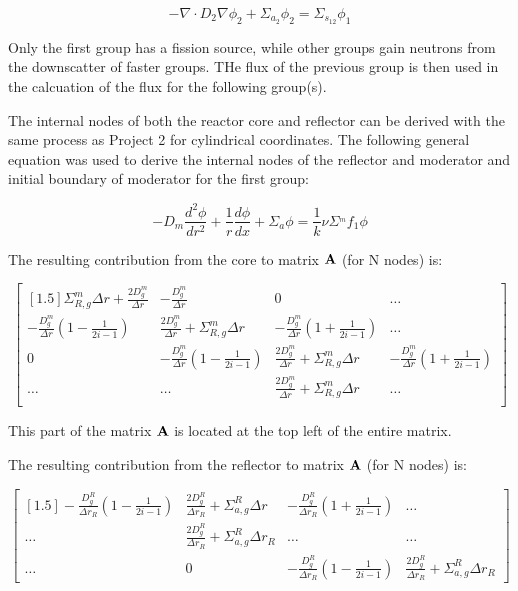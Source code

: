 \documentclass[../main.tex]{subfiles}
\begin{document}
	\begin{equation*}
		- \nabla \cdot D_{2} \nabla \phi_{2}+ \Sigma_{a_2} \phi_2 = \Sigma_{s_{12}} \phi_1
	\end{equation*}

Only the first group has a fission source, while other groups gain neutrons from the downscatter of faster groups.  THe flux of the previous group is then used in the calcuation of the flux for the following group(s).

The internal nodes of both the reactor core and reflector can be derived with the same process as Project 2 for cylindrical coordinates.  The following general equation was used to derive the internal nodes of the reflector and moderator  and initial boundary of moderator for the first group:

\begin{equation*}
		-D_m \frac{d^2 \phi}{d r^2} + \frac{1}{r} \frac{d \phi}{dx} + \Sigma_a \phi =   \frac{1}{k} \nu \Sigma^_mf_1 \phi
	\end{equation*}
	


The resulting contribution from the core to matrix $\mathbf{A}$ (for N nodes) is:

\[
	\begin{bmatrix}[1.5]
		 \Sigma^m_{R,g} \Delta r + \frac{2D^m_g}{\Delta r} & -\frac{D^m_g}{\Delta r} & 0 & \dots \\
		-\frac{D^m_g}{\Delta r} \left( 1 - \frac{1}{2i-1} \right) & \frac{2D^m_g}{\Delta r} + \Sigma^m_{R,g} \Delta r &  -\frac{D^m_g}{\Delta r} \left( 1 + \frac{1}{2i-1} \right) & \dots \\
		0 &  -\frac{D^m_g}{\Delta r} \left( 1 - \frac{1}{2i-1} \right) & \frac{2D^m_g}{\Delta r} + \Sigma^m_{R,g} \Delta r &  -\frac{D^m_g}{\Delta r} \left( 1 + \frac{1}{2i-1} \right)\\
		\dots & \dots & \frac{2D^m_g}{\Delta r} + \Sigma^m_{R,g} \Delta r & \dots\\
	
	\end{bmatrix}
	\]
	
This part of the matrix $\mathbf{A}$ is located at the top left of the entire matrix.
	
The resulting contribution from the reflector to matrix $\mathbf{A}$ (for N nodes) is:

\[
	\begin{bmatrix}[1.5]
		-\frac{D^R_g}{\Delta r_R} \left( 1 - \frac{1}{2i-1} \right) & \frac{2D^R_g}{\Delta r_R} + \Sigma^R_{a,g} \Delta r &  -\frac{D^R_g}{\Delta r_R} \left( 1 + \frac{1}{2i-1} \right) & \dots \\
		\dots & \frac{2D^R_g}{\Delta r_R} + \Sigma^R_{a,g} \Delta r_R  & \dots & \dots \\
		\dots & 0 & -\frac{D^R_g}{\Delta r_R} \left( 1 - \frac{1}{2i-1} \right) & \frac{2D^R_g}{\Delta r_R} + \Sigma^R_{a,g} \Delta r_R
	\end{bmatrix}
	\]
\end{document}
